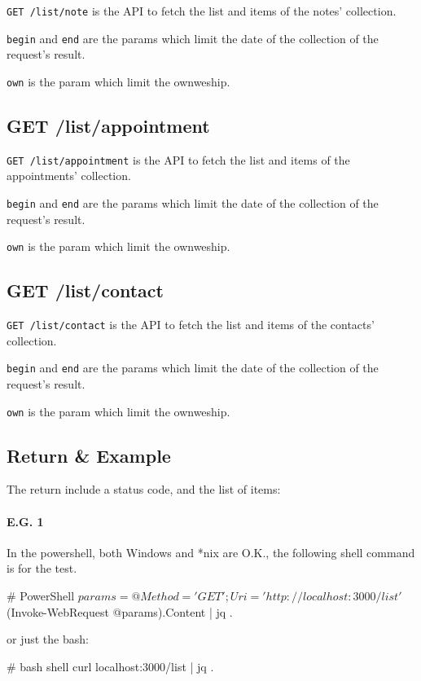 \documentclass{article}
\begin{document}
  \verb|GET /list/note| is the API to fetch the list and items of the notes' collection.

  \verb|begin| and \verb|end| are the params which limit the date of the collection of the request's result.

  \verb|own| is the param which limit the ownweship.

  \subsection{GET /list/appointment}

  \verb|GET /list/appointment| is the API to fetch the list and items of the appointments' collection.

  \verb|begin| and \verb|end| are the params which limit the date of the collection of the request's result.

  \verb|own| is the param which limit the ownweship.

  \subsection{GET /list/contact}

  \verb|GET /list/contact| is the API to fetch the list and items of the contacts' collection.

  \verb|begin| and \verb|end| are the params which limit the date of the collection of the request's result.

  \verb|own| is the param which limit the ownweship.  

  \subsection{Return \& Example}

  The return include a status code, and the list of items:
  
  \paragraph{E.G. 1}
  In the powershell, both Windows and *nix are O.K., the following shell command is for the test.
  \begin{powershell}
 # PowerShell
 $params = @{ Method = 'GET';
              Uri = 'http://localhost:3000/list'
            }
 $(Invoke-WebRequest  @params).Content  | jq .
  \end{powershell} 
  or just the bash:
  \begin{bash}
 # bash shell
 curl localhost:3000/list | jq .
  \end{bash}
  
\end{document}
